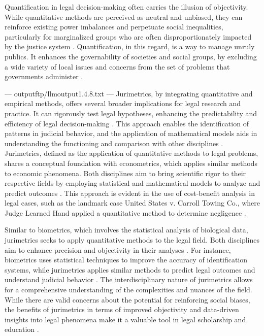Quantification in legal decision-making often carries the illusion of objectivity. While quantitative methods are perceived as neutral and unbiased, they can reinforce existing power imbalances and perpetuate social inequalities, particularly for marginalized groups who are often disproportionately impacted by the justice system \cite{10.1590/dados.2022.65.3.267,10.3390/fi9040068}. Quantification, in this regard, is a way to manage unruly publics. It enhances the governability of societies and social groups, by excluding a wide variety of local issues and concerns from the set of problems that governments administer \cite{at2023}.


---
outputftp/llmoutput1.4.8.txt
---
Jurimetrics, by integrating quantitative and empirical methods, offers several broader implications for legal research and practice. It can rigorously test legal hypotheses, enhancing the predictability and efficiency of legal decision-making \cite{nunes2018,de2010}. This approach enables the identification of patterns in judicial behavior, and the application of mathematical models aids in understanding the functioning and comparison with other disciplines \cite{ribeiro2021quantification,zabala2019d,silva2023role}. Jurimetrics, defined as the application of quantitative methods to legal problems, shares a conceptual foundation with econometrics, which applies similar methods to economic phenomena. Both disciplines aim to bring scientific rigor to their respective fields by employing statistical and mathematical models to analyze and predict outcomes \cite{ribeiro2021quantification}. This approach is evident in the use of cost-benefit analysis in legal cases, such as the landmark case United States v. Carroll Towing Co., where Judge Learned Hand applied a quantitative method to determine negligence \cite{zabala2019d}.

Similar to biometrics, which involves the statistical analysis of biological data, jurimetrics seeks to apply quantitative methods to the legal field. Both disciplines aim to enhance precision and objectivity in their analyses \cite{10.1590/dados.2022.65.3.267,1023071190721}. For instance, biometrics uses statistical techniques to improve the accuracy of identification systems, while jurimetrics applies similar methods to predict legal outcomes and understand judicial behavior \cite{10.1590/dados.2022.65.3.267,1023071190721}. The interdisciplinary nature of jurimetrics allows for a comprehensive understanding of the complexities and nuances of the field. While there are valid concerns about the potential for reinforcing social biases, the benefits of jurimetrics in terms of improved objectivity and data-driven insights into legal phenomena make it a valuable tool in legal scholarship and education \cite{10.1590/dados.2022.65.3.267,1023071190721}.

